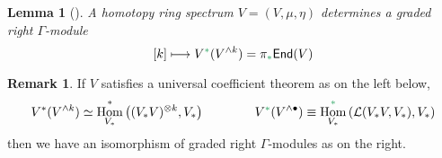 \documentclass[11pt,reqno
,draft
]{amsart}
\numberwithin{equation}{section}
\numberwithin{figure}{section}
\newtheorem{lemma}[equation]{Lemma}%
\newtheorem{claim}[equation]{Claim}%
\theoremstyle{definition} %
\newtheorem{remark}[equation]{Remark}%
\DeclareMathOperator{\Hom}{Hom}%
\newcommand{\Ksi}{\Xi}
\newcommand{\Loday}{\mathcal L}
\newcommand{\greenstar}{{\color{ForestGreen}\**}}
\DeclareMathOperator{\Tot}{Tot}
\newcommand{\End}{\mathsf{End}}
\begin{document}

\begin{lemma}[{\cite[\S 4.9]{Rob18}}]
        A homotopy ring spectrum $V = (V, \mu, \eta)$ determines a graded right $\Gamma$-module
        \[
                [k] \longmapsto V^{\greenstar}(V^{\wedge k}) = \pi_{\greenstar} \End(V)
        \]
\end{lemma}

\begin{remark}
        \label{UCT_REM}
        If $V$ satisfies a universal coefficient theorem as on the left below,
        \begin{equation}
                \label{UCT_EQ}
                V^{\**}(V^{\wedge k}) \simeq \Hom^{\**}_{V_{\**}}\left( (V_{\**}V)^{\otimes k}, V_{\**} \right)
                \qquad \qquad
                V^{\greenstar}(V^{\wedge \bullet}) \equiv %
                \Hom_{V_{\**}}^{\greenstar}\left( \Loday(V_{\**}V, V_{\**}), V_{\**} \right)
        \end{equation}
        then we have an isomorphism of graded right $\Gamma$-modules as on the right.
\end{remark}
\end{document}
